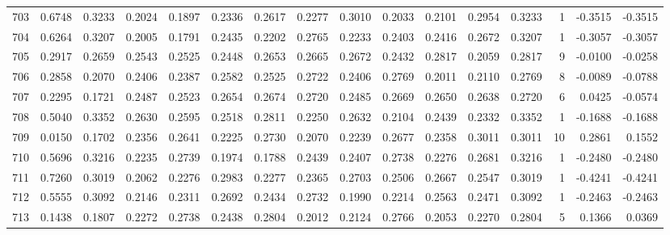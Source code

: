 \begin{tabular}{lrrrrrrrrrrrrrrr}
703 &      0.6748 &  0.3233 &  0.2024 &  0.1897 &  0.2336 &  0.2617 &  0.2277 &  0.3010 &  0.2033 &  0.2101 &   0.2954 &     0.3233 &      1 &                   -0.3515 &                    -0.3515 \\
704 &      0.6264 &  0.3207 &  0.2005 &  0.1791 &  0.2435 &  0.2202 &  0.2765 &  0.2233 &  0.2403 &  0.2416 &   0.2672 &     0.3207 &      1 &                   -0.3057 &                    -0.3057 \\
705 &      0.2917 &  0.2659 &  0.2543 &  0.2525 &  0.2448 &  0.2653 &  0.2665 &  0.2672 &  0.2432 &  0.2817 &   0.2059 &     0.2817 &      9 &                   -0.0100 &                    -0.0258 \\
706 &      0.2858 &  0.2070 &  0.2406 &  0.2387 &  0.2582 &  0.2525 &  0.2722 &  0.2406 &  0.2769 &  0.2011 &   0.2110 &     0.2769 &      8 &                   -0.0089 &                    -0.0788 \\
707 &      0.2295 &  0.1721 &  0.2487 &  0.2523 &  0.2654 &  0.2674 &  0.2720 &  0.2485 &  0.2669 &  0.2650 &   0.2638 &     0.2720 &      6 &                    0.0425 &                    -0.0574 \\
708 &      0.5040 &  0.3352 &  0.2630 &  0.2595 &  0.2518 &  0.2811 &  0.2250 &  0.2632 &  0.2104 &  0.2439 &   0.2332 &     0.3352 &      1 &                   -0.1688 &                    -0.1688 \\
709 &      0.0150 &  0.1702 &  0.2356 &  0.2641 &  0.2225 &  0.2730 &  0.2070 &  0.2239 &  0.2677 &  0.2358 &   0.3011 &     0.3011 &     10 &                    0.2861 &                     0.1552 \\
710 &      0.5696 &  0.3216 &  0.2235 &  0.2739 &  0.1974 &  0.1788 &  0.2439 &  0.2407 &  0.2738 &  0.2276 &   0.2681 &     0.3216 &      1 &                   -0.2480 &                    -0.2480 \\
711 &      0.7260 &  0.3019 &  0.2062 &  0.2276 &  0.2983 &  0.2277 &  0.2365 &  0.2703 &  0.2506 &  0.2667 &   0.2547 &     0.3019 &      1 &                   -0.4241 &                    -0.4241 \\
712 &      0.5555 &  0.3092 &  0.2146 &  0.2311 &  0.2692 &  0.2434 &  0.2732 &  0.1990 &  0.2214 &  0.2563 &   0.2471 &     0.3092 &      1 &                   -0.2463 &                    -0.2463 \\
713 &      0.1438 &  0.1807 &  0.2272 &  0.2738 &  0.2438 &  0.2804 &  0.2012 &  0.2124 &  0.2766 &  0.2053 &   0.2270 &     0.2804 &      5 &                    0.1366 &                     0.0369 \\

\end{tabular}
